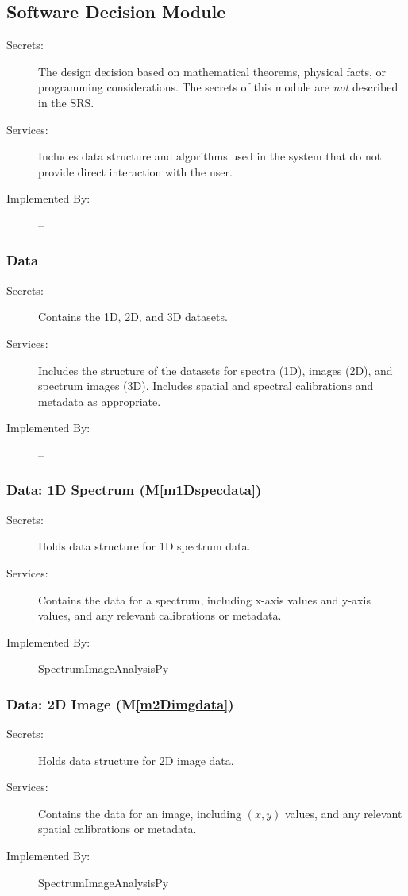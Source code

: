 \documentclass[12pt, titlepage]{article}
\newcommand{\mref}[1]{M\ref{#1}}
\newcommand{\progname}{SpectrumImageAnalysisPy}
\begin{document}
\subsection{Software Decision Module}

\begin{description}
\item[Secrets:] The design decision based on mathematical theorems, physical
  facts, or programming considerations. The secrets of this module are
  \emph{not} described in the SRS.
\item[Services:] Includes data structure and algorithms used in the system that
  do not provide direct interaction with the user. 
\item[Implemented By:] --
\end{description}

\subsubsection{Data}
\begin{description}
	\item[Secrets:]Contains the 1D, 2D, and 3D datasets.
	\item[Services:]Includes the structure of the datasets for spectra (1D), images (2D), and spectrum images (3D). Includes spatial and spectral calibrations and metadata as appropriate.
	\item[Implemented By:] --
\end{description}

\subsubsection{Data: 1D Spectrum (\mref{m1Dspecdata})}
\begin{description}
	\item[Secrets:]Holds data structure for 1D spectrum data.
	\item[Services:]Contains the data for a spectrum, including x-axis values and y-axis values, and any relevant calibrations or metadata.
	\item[Implemented By:] \progname
\end{description}

\subsubsection{Data: 2D Image (\mref{m2Dimgdata})}
\begin{description}
	\item[Secrets:]Holds data structure for 2D image data.
	\item[Services:]Contains the data for an image, including $(x,y)$ values, and any relevant spatial calibrations or metadata.
	\item[Implemented By:] \progname
\end{description}
\end{document}
